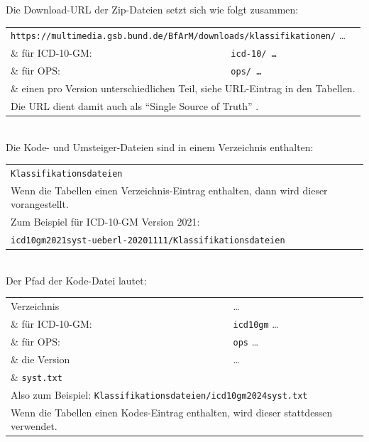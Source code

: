 Die Download-URL der Zip-Dateien setzt sich wie folgt zusammen:

\begingroup
\renewcommand{\arraystretch}{1.0}
\begin{tabular}{p{4cm}l}
\multicolumn{2}{l}{\texttt{https://multimedia.gsb.bund.de/BfArM/downloads/klassifikationen/} \ldots} \\
\& für ICD-10-GM: & \texttt{icd-10/ \ldots} \\
\& für OPS: & \texttt{ops/ \ldots} \\
\multicolumn{2}{l}{\& einen pro Version unterschiedlichen Teil, siehe URL-Eintrag in den Tabellen.} \\
\multicolumn{2}{l}{Die URL dient damit auch als ``Single Source of Truth'' \citep[Seite 257]{bonnefoy2024definitive}.} \\
\end{tabular}
\endgroup \\

Die Kode- und Umsteiger-Dateien sind in einem Verzeichnis enthalten:

\begingroup
\renewcommand{\arraystretch}{1.0}
\begin{tabular}{l}
\texttt{Klassifikationsdateien} \\
Wenn die Tabellen einen Verzeichnis-Eintrag enthalten, dann wird dieser vorangestellt. \\
Zum Beispiel für ICD-10-GM Version 2021: \\
\texttt{icd10gm2021syst-ueberl-20201111/Klassifikationsdateien} \\
\end{tabular}
\endgroup \\

Der Pfad der Kode-Datei lautet:

\begingroup
\renewcommand{\arraystretch}{1.0}
\begin{tabular}{p{4cm}l}
Verzeichnis & \ldots \\
\& für ICD-10-GM: & \texttt{icd10gm} \ldots \\
\& für OPS: & \texttt{ops} \ldots \\
\& die Version & \ldots\\
\& \texttt{syst.txt} \\
\multicolumn{2}{l}{Also zum Beispiel: \texttt{Klassifikationsdateien/icd10gm2024syst.txt}} \\
\multicolumn{2}{l}{Wenn die Tabellen einen Kodes-Eintrag enthalten, wird dieser stattdessen verwendet.} \\
\end{tabular}
\endgroup \\

